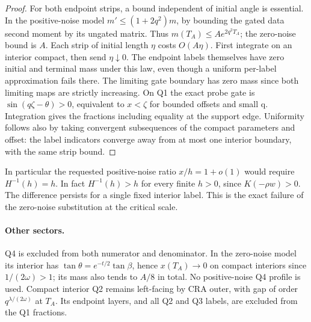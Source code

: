 \documentclass[11pt]{article}
\begin{document}
\begin{proof}
For both endpoint strips, a bound independent of initial angle is
essential. In the positive-noise model \(m'\le(1+2q^2)m\), by bounding
the gated data second moment by its ungated matrix. Thus \(m(T_A)\le
Ae^{2q^2T_A}\); the zero-noise bound is \(A\). Each strip of initial
length \(\eta\) costs \(O(A\eta)\). First integrate on an interior
compact, then send \(\eta\downarrow0\). The endpoint labels themselves
have zero initial and terminal mass under this law, even though a
uniform per-label approximation fails there. The limiting gate boundary
has zero mass since both limiting maps are strictly increasing.
On Q1 the exact probe gate is \(\sin(q\zeta-\theta)>0\), equivalent
to \(x<\zeta\) for bounded offsets and small q. Integration gives the
fractions including equality at the support edge. Uniformity follows
also by taking convergent subsequences of the compact parameters and
offset: the label indicators converge away from at most one interior
boundary, with the same strip bound.
\end{proof}

In particular the requested positive-noise ratio \(x/h=1+o(1)\)
would require \(H^{-1}(h)=h\). In fact \(H^{-1}(h)>h\) for every
finite \(h>0\), since \(K(-\rho w)>0\).
The difference persists for a single fixed interior label. This is
the exact failure of the zero-noise substitution at the critical scale.

\paragraph{Other sectors.}
Q4 is excluded from both numerator and denominator. In the zero-noise
model its interior has \(\tan\theta=e^{-t/2}\tan\beta\), hence
\(x(T_A)\to0\) on compact interiors since \(1/(2\omega)>1\);
its mass also tends to \(A/8\) in total. No positive-noise Q4 profile
is used. Compact interior Q2 remains left-facing by CRA outer, with
gap of order \(q^{\lambda/(2\omega)}\) at \(T_A\). Its endpoint layers,
and all Q2 and Q3 labels, are excluded from the Q1 fractions.
\end{document}
